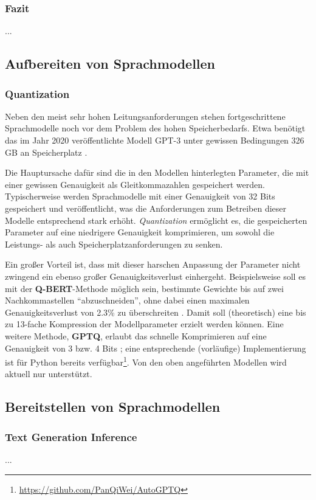 \subsubsection{Fazit}

...

\subsection{Aufbereiten von Sprachmodellen}

\subsubsection{Quantization}\label{sec:quantization}

Neben den meist sehr hohen Leitungsanforderungen stehen fortgeschrittene Sprachmodelle noch vor dem Problem des hohen Speicherbedarfs. Etwa benötigt das im Jahr 2020 veröffentlichte Modell GPT-3 unter gewissen Bedingungen 326 GB an Speicherplatz \cite[1]{Frantar2022}.

\smallskip\par\noindent
Die Hauptursache dafür sind die in den Modellen hinterlegten Parameter, die mit einer gewissen Genauigkeit als Gleitkommazahlen gespeichert werden. Typischerweise werden Sprachmodelle mit einer Genauigkeit von 32 Bits gespeichert und veröffentlicht, was die Anforderungen zum Betreiben dieser Modelle entsprechend stark erhöht. \textit{Quantization} ermöglicht es, die gespeicherten Parameter auf eine niedrigere Genauigkeit komprimieren, um sowohl die Leistungs- als auch Speicherplatzanforderungen zu senken.

\smallskip\par\noindent
Ein großer Vorteil ist, dass mit dieser harschen Anpassung der Parameter nicht zwingend ein ebenso großer Genauigkeitsverlust einhergeht. Beispielsweise soll es mit der \textbf{Q-BERT}-Methode möglich sein, bestimmte Gewichte bis auf zwei Nachkommastellen \enquote{abzuschneiden}, ohne dabei einen maximalen Genauigkeitsverlust von 2.3\% zu überschreiten \cite[1]{Shen2019}. Damit soll (theoretisch) eine bis zu 13-fache Kompression der Modellparameter erzielt werden können. Eine weitere Methode, \textbf{GPTQ}, erlaubt das schnelle Komprimieren auf eine Genauigkeit von 3 bzw. 4 Bits \cite[1]{Frantar2022}; eine entsprechende (vorläufige) Implementierung ist für Python bereits verfügbar\footnote{\url{https://github.com/PanQiWei/AutoGPTQ}}. Von den oben angeführten Modellen wird aktuell nur  unterstützt.

\subsection{Bereitstellen von Sprachmodellen}

\subsubsection{Text Generation Inference}

...